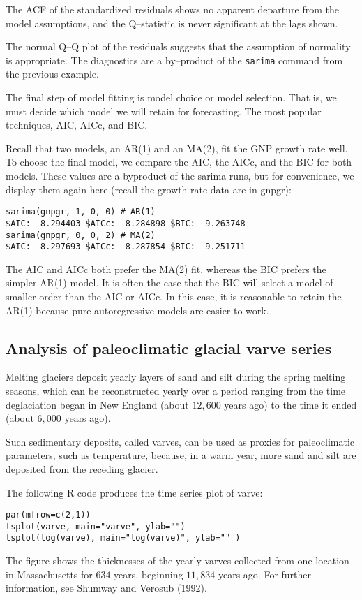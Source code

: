 \documentclass[
paper=128mm:96mm, %
fontsize=9.5pt, %
pagesize, %
parskip=half-, %
]{scrartcl} %
\theoremstyle{mythmstyle} %
\begin{document}
The ACF of the standardized residuals shows no apparent departure from the model assumptions, and the Q--statistic is never significant at the lags shown. 

The normal Q--Q plot of the residuals suggests that the assumption of normality is appropriate. The diagnostics are a by--product of the \texttt{sarima} command from the previous example.
\clearpage


The final step of model fitting is model choice or model selection. That is, we must decide which model we will retain for forecasting. The most popular techniques, AIC, AICc, and BIC.

Recall that two models, an AR(1) and an MA(2), fit the GNP growth rate well. To choose the final model, we compare the AIC, the AICc, and the BIC for both models. These values are a byproduct of the sarima runs, but for convenience, we display them again here (recall the growth rate data are in gnpgr):
%
\begin{lstlisting}[belowskip=-0.8 \baselineskip]
sarima(gnpgr, 1, 0, 0) # AR(1)
$AIC: -8.294403 $AICc: -8.284898 $BIC: -9.263748
sarima(gnpgr, 0, 0, 2) # MA(2)
$AIC: -8.297693 $AICc: -8.287854 $BIC: -9.251711
\end{lstlisting}
%
The AIC and AICc both prefer the MA(2) fit, whereas the BIC prefers the simpler AR(1) model. It is often the case that the BIC will select a model of smaller order than the AIC or AICc. In this case, it is reasonable to retain the AR(1) because pure autoregressive models are easier to work.
\clearpage




\subsection{Analysis of paleoclimatic glacial varve series}

Melting glaciers deposit yearly layers of sand and silt during the spring melting seasons, which can be reconstructed yearly over a period ranging from the time deglaciation began in New England (about $12,600$ years ago) to the time it ended (about $6,000$ years ago). 

Such sedimentary deposits, called varves, can be used as proxies for paleoclimatic parameters, such as temperature, because, in a warm year, more sand and silt are deposited from the receding glacier. 

The following R code produces the time series plot of varve:
%
\begin{lstlisting}[belowskip=-0.8 \baselineskip]
par(mfrow=c(2,1))
tsplot(varve, main="varve", ylab="")
tsplot(log(varve), main="log(varve)", ylab="" )
\end{lstlisting}
%
The figure shows the thicknesses of the yearly varves collected from one location in Massachusetts for $634$ years, beginning $11,834$ years ago. For further information, see Shumway and Verosub (1992). 
\clearpage
\end{document}

